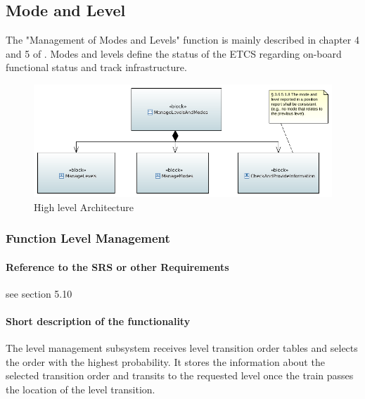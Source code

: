 \subsection{Mode and Level}


The "Management of Modes and Levels" function is mainly described in chapter 4
and 5 of \citep{subset-026}. Modes and levels define the status of the ETCS
regarding on-board functional status and track infrastructure.

\begin{landscape}
\begin{figure}[hbtp]
\centering
\includegraphics[scale=1]{images/FunctionalArchitecture.png}
\caption{High level Architecture}
\end{figure}
\end{landscape}

\clearpage

\subsubsection{Function Level Management}%
\paragraph{Reference to the SRS or other Requirements}

see \citep{subset-026} section 5.10

\paragraph{Short description of the functionality}

The level management subsystem receives level transition order tables and selects the order with the highest probability. It stores the information about the selected transition order and transits to the requested level once the train passes the location of the level transition.

